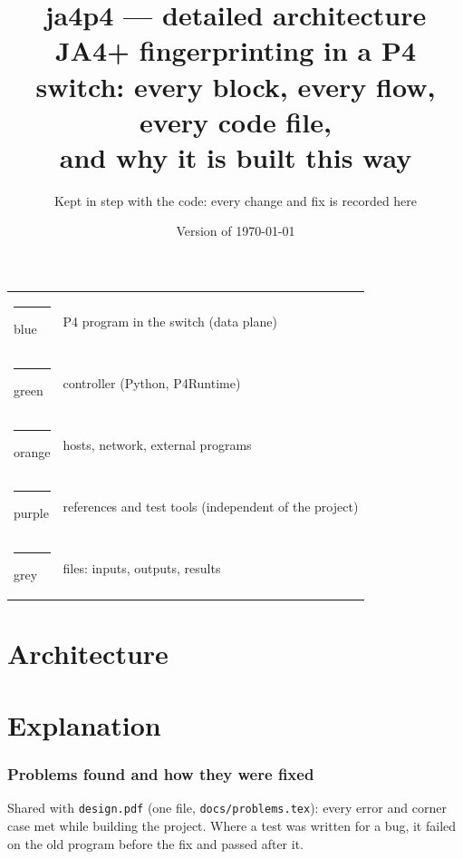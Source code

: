 \documentclass[11pt,a4paper]{article}
\title{\textbf{ja4p4 --- detailed architecture}\\[3pt]
\large JA4+ fingerprinting in a P4 switch: every block, every flow, every code file,\\ and why it is built this way}
\author{Kept in step with the code: every change and fix is recorded here}
\date{Version of \today}
\newcommand{\code}[1]{\texttt{#1}}
\begin{document}
\maketitle
\begin{center}\small
\begin{tabular}{@{}l l@{}}
\textcolor{swd}{\rule{3mm}{3mm}} blue & P4 program in the switch (data plane) \\
\textcolor{ctd}{\rule{3mm}{3mm}} green & controller (Python, P4Runtime) \\
\textcolor{hod}{\rule{3mm}{3mm}} orange & hosts, network, external programs \\
\textcolor{rfd}{\rule{3mm}{3mm}} purple & references and test tools (independent of the project) \\
\textcolor{fid}{\rule{3mm}{3mm}} grey & files: inputs, outputs, results \\
\end{tabular}
\end{center}
\tableofcontents
\newpage

\part{Architecture}






\part{Explanation}






\section{Problems found and how they were fixed}
\label{sec:problems}
Shared with \code{design.pdf} (one file, \code{docs/problems.tex}): every error and corner case met while building
the project. Where a test was written for a bug, it failed on the old program before the fix and passed after it.




\end{document}
